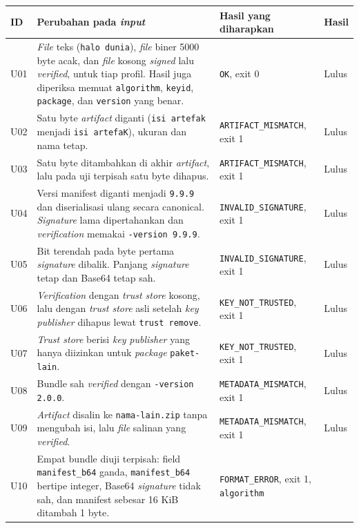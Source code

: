 {\small
\begin{longtable}{@{}p{1cm}p{7.2cm}p{4.3cm}p{1.6cm}@{}}
\toprule
ID & Perubahan pada \textit{input} & Hasil yang diharapkan & Hasil \\
\midrule
\endhead
U01 & \textit{File} teks (\texttt{halo dunia}), \textit{file} biner 5000 byte acak, dan \textit{file} kosong
  \textit{signed} lalu \textit{verified}, untuk tiap profil. Hasil juga diperiksa memuat
  \texttt{algorithm}, \texttt{keyid}, \texttt{package}, dan \texttt{version} yang benar.
  & \texttt{OK}, exit 0 & Lulus \\
U02 & Satu byte \textit{artifact} diganti (\texttt{isi artefak} menjadi \texttt{isi artefaK}),
  ukuran dan nama tetap. & \texttt{ARTIFACT\_MISMATCH}, exit 1 & Lulus \\
U03 & Satu byte ditambahkan di akhir \textit{artifact}, lalu pada uji terpisah satu byte dihapus.
  & \texttt{ARTIFACT\_MISMATCH}, exit 1 & Lulus \\
U04 & Versi manifest diganti menjadi \texttt{9.9.9} dan diserialisasi ulang secara
  canonical. \textit{Signature} lama dipertahankan dan \textit{verification} memakai
  \texttt{-version 9.9.9}. & \texttt{INVALID\_SIGNATURE}, exit 1 & Lulus \\
U05 & Bit terendah pada byte pertama \textit{signature} dibalik. Panjang \textit{signature} tetap dan
  Base64 tetap sah. & \texttt{INVALID\_SIGNATURE}, exit 1 & Lulus \\
U06 & \textit{Verification} dengan \textit{trust store} kosong, lalu dengan \textit{trust store} asli
  setelah \textit{key} \textit{publisher} dihapus lewat \texttt{trust remove}.
  & \texttt{KEY\_NOT\_TRUSTED}, exit 1 & Lulus \\
U07 & \textit{Trust store} berisi \textit{key} \textit{publisher} yang hanya diizinkan untuk \textit{package}
  \texttt{paket-lain}. & \texttt{KEY\_NOT\_TRUSTED}, exit 1 & Lulus \\
U08 & Bundle sah \textit{verified} dengan \texttt{-version 2.0.0}.
  & \texttt{METADATA\_MISMATCH}, exit 1 & Lulus \\
U09 & \textit{Artifact} disalin ke \texttt{nama-lain.zip} tanpa mengubah isi, lalu \textit{file} salinan
  yang \textit{verified}. & \texttt{METADATA\_MISMATCH}, exit 1 & Lulus \\
U10 & Empat bundle diuji terpisah: field \texttt{manifest\_b64} ganda,
  \texttt{manifest\_b64} bertipe integer, Base64 \textit{signature} tidak sah, dan manifest
  sebesar 16 KiB ditambah 1 byte. & \texttt{FORMAT\_ERROR}, exit 1, \texttt{algorithm}

\end{longtable}}
